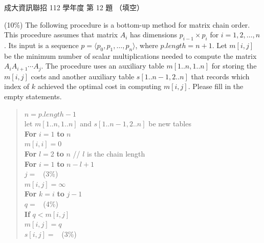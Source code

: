 \begin{pastexam}[label={px:ncku-112-prog-12}]{成大資訊聯招 112 學年度 第 12 題}
（填空）

(10\%) The following procedure is a bottom-up method for matrix chain order. This procedure assumes that
matrix $A_i$ has dimensions $p_{i-1}\times p_i$ for $i=1,2,\ldots,n$. Its input is a sequence
$p=\langle p_0,p_1,\ldots,p_n\rangle$, where $p.length=n+1$. Let $m[i,j]$ be the minimum number of scalar
multiplications needed to compute the matrix $A_iA_{i+1}\cdots A_j$. The procedure uses an auxiliary table
$m[1..n,1..n]$ for storing the $m[i,j]$ costs and another auxiliary table $s[1..n-1,2..n]$ that records
which index of $k$ achieved the optimal cost in computing $m[i,j]$. Please fill in the empty statements.

\begin{quote}
$n=p.length-1$\\
let $m[1..n,1..n]$ and $s[1..n-1,2..n]$ be new tables\\
\textbf{For} $i=1$ \textbf{to} $n$\\
\hspace*{2em}$m[i,i]=0$\\
\textbf{For} $l=2$ \textbf{to} $n$ \quad // $l$ is the chain length\\
\hspace*{2em}\textbf{For} $i=1$ \textbf{to} $n-l+1$\\
\hspace*{4em}$j=$ ~(3\%)\\
\hspace*{4em}$m[i,j]=\infty$\\
\hspace*{4em}\textbf{For} $k=i$ \textbf{to} $j-1$\\
\hspace*{6em}$q=$ ~(4\%)\\
\hspace*{6em}\textbf{If} $q<m[i,j]$\\
\hspace*{8em}$m[i,j]=q$\\
\hspace*{8em}$s[i,j]=$ ~(3\%)
\end{quote}
\end{pastexam}

